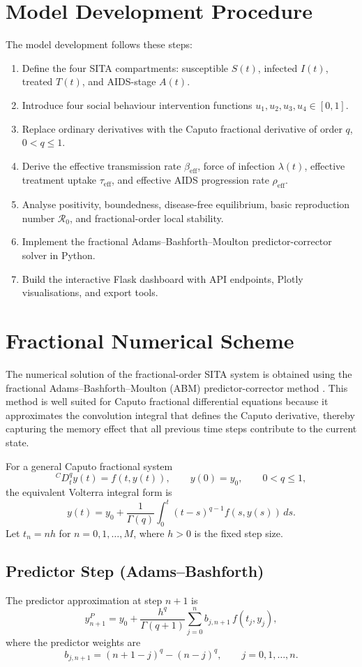 \documentclass[12pt,a4paper,oneside]{report}
\newcommand{\Rzero}{\mathcal{R}_0}
\newcommand{\CaputoD}[2]{{}^{C}D_{#1}^{#2}}
\newcommand{\beff}{\beta_{\mathrm{eff}}}
\newcommand{\taueff}{\tau_{\mathrm{eff}}}
\newcommand{\rhoeff}{\rho_{\mathrm{eff}}}
\begin{document}
\section{Model Development Procedure}
The model development follows these steps:
\begin{enumerate}
  \item Define the four SITA compartments: susceptible $S(t)$, infected $I(t)$, treated $T(t)$, and AIDS-stage $A(t)$.
  \item Introduce four social behaviour intervention functions $u_1, u_2, u_3, u_4 \in [0,1]$.
  \item Replace ordinary derivatives with the Caputo fractional derivative of order $q$, $0 < q \leq 1$.
  \item Derive the effective transmission rate $\beff$, force of infection $\lambda(t)$, effective treatment uptake $\taueff$, and effective AIDS progression rate $\rhoeff$.
  \item Analyse positivity, boundedness, disease-free equilibrium, basic reproduction number $\Rzero$, and fractional-order local stability.
  \item Implement the fractional Adams--Bashforth--Moulton predictor-corrector solver in Python.
  \item Build the interactive Flask dashboard with API endpoints, Plotly visualisations, and export tools.
\end{enumerate}

\section{Fractional Numerical Scheme}
The numerical solution of the fractional-order SITA system is obtained using the fractional Adams--Bashforth--Moulton (ABM) predictor-corrector method \citep{Diethelm2002,Diethelm2010}. This method is well suited for Caputo fractional differential equations because it approximates the convolution integral that defines the Caputo derivative, thereby capturing the memory effect that all previous time steps contribute to the current state.

For a general Caputo fractional system
\[
\CaputoD{t}{q}y(t)=f(t,y(t)),\qquad y(0)=y_0,\qquad 0<q\leq1,
\]
the equivalent Volterra integral form is
\[
y(t)=y_0+\frac{1}{\Gamma(q)}\int_0^t (t-s)^{q-1}f(s,y(s))\,ds.
\]
Let $t_n=nh$ for $n=0,1,\ldots,M$, where $h>0$ is the fixed step size.

\subsection{Predictor Step (Adams--Bashforth)}
The predictor approximation at step $n+1$ is
\begin{equation}
y_{n+1}^{P}=y_0+\frac{h^q}{\Gamma(q+1)}\sum_{j=0}^{n}b_{j,n+1}\,f(t_j,y_j),
\label{eq:abm_predictor}
\end{equation}
where the predictor weights are
\begin{equation}
b_{j,n+1}=(n+1-j)^q-(n-j)^q, \qquad j=0,1,\ldots,n.
\label{eq:predictor_weights}
\end{equation}
\end{document}
